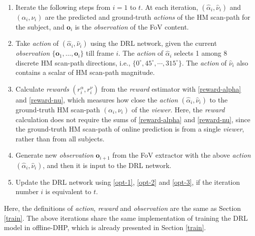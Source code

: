 \documentclass[10pt,journal,compsoc]{IEEEtran}
\begin{document}
%
\begin{enumerate}
  \item Iterate the following steps from $i=1$ to $t$. At each iteration, $(\hat{\alpha}_i,\hat{\nu}_i)$ and $(\alpha_i,\nu_i)$ are the predicted and ground-truth \textit{actions} of the HM scan-path for the subject, and $\mathbf{o}_i$ is the \textit{observation} of the FoV content.
  \item Take \textit{action} of $(\hat{\alpha}_i,\hat{\nu}_i)$ using the DRL network, given the current \textit{observation} $\{\mathbf{o}_1, \ldots, \mathbf{o}_i\}$ till frame $i$. The \textit{action} of $\hat{\alpha}_i$ selects 1 among 8 discrete HM scan-path directions, i.e., $\{ 0^{\circ}, 45^{\circ}, \cdots, 315^{\circ} \}$. The \textit{action} of $\hat{\nu}_i$ also contains a scalar of HM scan-path magnitude.
  \item Calculate \textit{rewards} $(r^{\alpha}_{i}, r^{\nu}_{i})$ from the \textit{reward} estimator with \eqref{reward-alpha} and \eqref{reward-nu}, which measures how close the \textit{action} $(\hat{\alpha}_i,\hat{\nu}_i)$ to the ground-truth HM scan-path $(\alpha_i,\nu_i)$  of the \textit{viewer}. Here, the \textit{reward} calculation does not require the sums of \eqref{reward-alpha} and \eqref{reward-nu}, since the ground-truth HM scan-path of online prediction is from a single \textit{viewer}, rather than from all subjects.
  \item Generate new \textit{observation} ${\mathbf{o}_{i+1}}$ from the FoV extractor with the above \textit{action} $(\hat{\alpha}_i,\hat{\nu}_i)$, and then it is input to the DRL network.
  \item Update the DRL network using \eqref{opt-1}, \eqref{opt-2} and \eqref{opt-3}, if the iteration number $i$ is equivalent to $t$.
\end{enumerate}
Here,  the definitions of \textit{action}, \textit{reward} and \textit{observation} are the same as Section \ref{train}.
The above iterations share the same implementation of training the DRL model in offline-DHP, which is already presented in Section \ref{train}.
\end{document}
